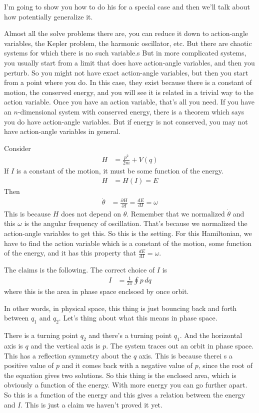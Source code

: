 I'm going to show you how to do his for a special case and then we'll talk
about how potentially generalize it.

Almost all the solve problems there are,
you can reduce it down to action-angle variables,
the Kepler problem,
the harmonic oscillator,
etc.
But there are chaotic systems for which there is no such variable.s
But in more complicated systems,
you usually start from a limit that does have action-angle variables,
and then you perturb.
So you might not have exact action-angle variables,
but then you start from a point where you do.
In this case,
they exist because there is a constant of motion,
the conserved energy,
and you will see it is related in a trivial way to the action variable.
Once you have an action variable,
that's all you need.
If you have an $n$-dimensional system with conserved energy,
there is a theorem which says you do have action-angle variables.
But if energy is not conserved,
you may not have action-angle variables in general.

Consider
\begin{align}
    H &=
    \frac{p^2}{2m} + V(q)
\end{align}
If $I$ is a constant of the motion,
it must be some function of the energy.
\begin{align}
    H &= H(I) =  E
\end{align}
Then
\begin{align}
    \dot{\theta}
    &=
    \frac{\partial H}{\partial I}
    =
    \frac{d E}{dI}
    = \omega
\end{align}
This is because $H$ does not depend on $\theta$.
Remember that we normalized $\dot{\theta}$
and this $\omega$ is the angular frequency of oscillation.
That's because we normalized the action-angle variables to get this.
So this is the setting.
For this Hamiltonian,
we have to find the action variable which is a constant of the motion,
some function of the energy,
and it has this property that $\frac{dE}{dI} = \omega$.

The claims is the following.
The correct choice of $I$ is
\begin{align}
    I &=
    \frac{1}{2\pi}
    \oint p\, dq
\end{align}
where this is the area in phase space enclsoed by once orbit.

In other words,
in physical space,
this thing is just bouncing back and forth between $q_1$ and $q_2$.
Let's thing about what this means in phase space.

There is a turning point $q_2$ and there's a turning point $q_1$.
And the horizontal axis is $q$ and the vertical axis is $p$.
The system traces out an orbit in phase space.
This has a reflection symmetry about the $q$ axis.
This is because therei s a positive value of $p$ and it comes back with a
negative value of $p$,
since the root of the equation gives two solutions.
So this thing is the enclosed area,
which is obviously a function of the energy.
With more energy you can go further apart.
So this is a function of the energy and this gives a relation between the energy
and $I$.
This is just a claim we haven't proved it yet.

